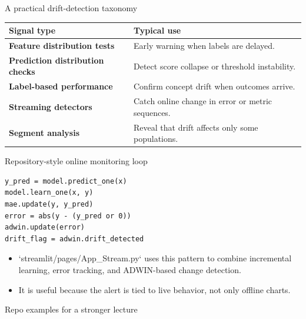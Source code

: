 \begin{frame}{A practical drift-detection taxonomy}
\begin{tabularx}{\textwidth}{>{\bfseries}l X}
Signal type & Typical use \\
\toprule
Feature distribution tests & Early warning when labels are delayed. \\
Prediction distribution checks & Detect score collapse or threshold instability. \\
Label-based performance & Confirm concept drift when outcomes arrive. \\
Streaming detectors & Catch online change in error or metric sequences. \\
Segment analysis & Reveal that drift affects only some populations. \\
\bottomrule
\end{tabularx}
\coursefooter
\end{frame}

\begin{frame}[fragile]{Repository-style online monitoring loop}
\begin{lstlisting}[style=coursepython]
y_pred = model.predict_one(x)
model.learn_one(x, y)
mae.update(y, y_pred)
error = abs(y - (y_pred or 0))
adwin.update(error)
drift_flag = adwin.drift_detected
\end{lstlisting}
\begin{itemize}
\item `streamlit/pages/App_Stream.py` uses this pattern to combine incremental learning, error tracking, and ADWIN-based change detection.
\item It is useful because the alert is tied to live behavior, not only offline charts.
\end{itemize}
\coursefooter
\end{frame}

\begin{frame}{Repo examples for a stronger lecture}
\coursefooter
\end{frame}

